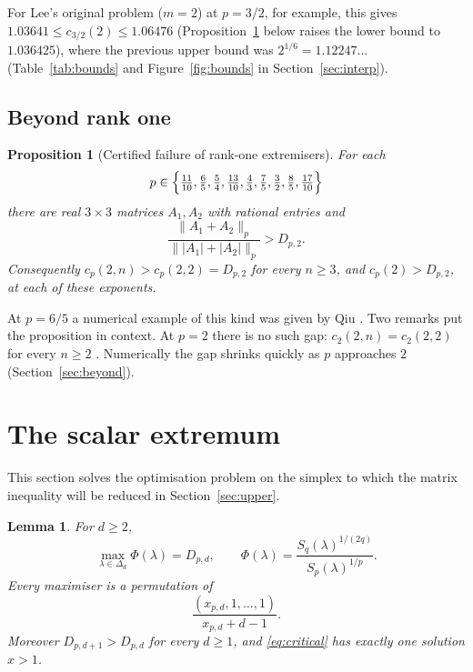 \documentclass[11pt,a4paper]{article}
\numberwithin{equation}{section}
\newtheorem{lemma}[theorem]{Lemma}
\newtheorem{proposition}[theorem]{Proposition}
\theoremstyle{definition}
\theoremstyle{remark}
\begin{document}
For Lee's original problem (\(m=2\)) at \(p=3/2\), for example, this
gives \(1.03641\le c_{3/2}(2)\le1.06476\) (Proposition~\ref{prop:certified} below raises the lower bound to \(1.036425\)), where the previous upper
bound was \(2^{1/6}=1.12247\ldots\) (Table~\ref{tab:bounds} and
Figure~\ref{fig:bounds} in Section~\ref{sec:interp}).

\subsection{Beyond rank one}

\begin{proposition}[Certified failure of rank-one extremisers]
\label{prop:certified}
For each
\[
 p\in\Bigl\{\tfrac{11}{10},\tfrac65,\tfrac54,\tfrac{13}{10},\tfrac43,
 \tfrac75,\tfrac32,\tfrac85,\tfrac{17}{10}\Bigr\}
\]
there are real \(3\times3\) matrices \(A_1,A_2\) with rational entries
and
\[
 \frac{\|A_1+A_2\|_p}{\||A_1|+|A_2|\|_p}>D_{p,2}.
\]
Consequently \(c_p(2,n)>c_p(2,2)=D_{p,2}\) for every \(n\ge3\), and
\(c_p(2)>D_{p,2}\), at each of these exponents.
\end{proposition}

At \(p=6/5\) a numerical example of this kind was given by Qiu
\cite[Section 5]{Qiu}. Two remarks put the proposition in context. At
\(p=2\) there is no such gap: \(c_2(2,n)=c_2(2,2)\) for every \(n\ge2\)
\cite[Theorem 6.2]{Zhang}. Numerically the gap shrinks quickly as \(p\)
approaches \(2\) (Section~\ref{sec:beyond}).

\section{The scalar extremum}\label{sec:scalar}

This section solves the optimisation problem on the simplex to which the
matrix inequality will be reduced in Section~\ref{sec:upper}.

\begin{lemma}\label{lem:scalar}
For \(d\ge2\),
\begin{equation}\label{eq:simplex}
 \max_{\lambda\in\Delta_d}\Phi(\lambda)=D_{p,d},
 \qquad
 \Phi(\lambda)=\frac{S_q(\lambda)^{1/(2q)}}{S_p(\lambda)^{1/p}}.
\end{equation}
Every maximiser is a permutation of
\begin{equation}\label{eq:spectrum}
 \frac{(x_{p,d},1,\ldots,1)}{x_{p,d}+d-1}.
\end{equation}
Moreover \(D_{p,d+1}>D_{p,d}\) for every \(d\ge1\), and
\eqref{eq:critical} has exactly one solution \(x>1\).
\end{lemma}
\end{document}
